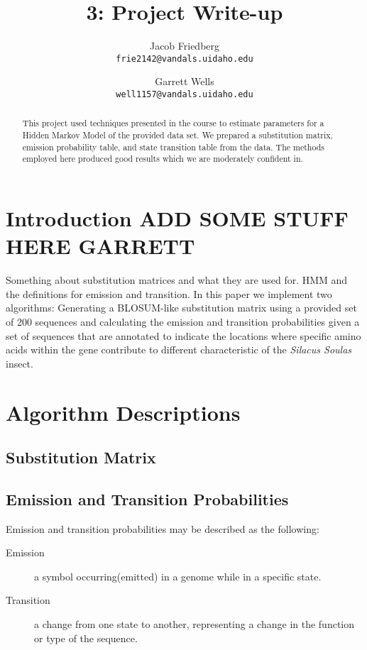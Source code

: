 \documentclass[a4paper,11pt]{article}
\title{3: Project Write-up}
\author{
Jacob Friedberg \\
\texttt{frie2142@vandals.uidaho.edu}
\and
Garrett Wells \\
\texttt{well1157@vandals.uidaho.edu}
}
\begin{document}
\maketitle
\begin{abstract}
    This project used techniques presented in the course to estimate parameters for a Hidden Markov Model of the provided data set. We prepared a substitution matrix, emission probability table, and state transition table from the data. The methods employed here produced good results which we are moderately confident in.
\end{abstract}

\section{Introduction ADD SOME STUFF HERE GARRETT}
Something about substitution matrices and what they are used for. HMM and the definitions for emission and transition. In this paper we implement two algorithms: Generating a BLOSUM-like substitution matrix using a provided set of 200 sequences and calculating the emission and transition probabilities given a set of sequences that are annotated to indicate the locations where specific amino acids within the gene contribute to different characteristic of the \textit{Silacus Soulas} insect.

\section{Algorithm Descriptions}

\subsection{Substitution Matrix}

\subsection{Emission and Transition Probabilities}
Emission and transition probabilities may be described as the following:

\begin{description}
    \item[Emission] a symbol occurring(emitted) in a genome while in a specific state.
    \item[Transition] a change from one state to another, representing a change in the function or type of the sequence.
\end{description}
\end{document}
